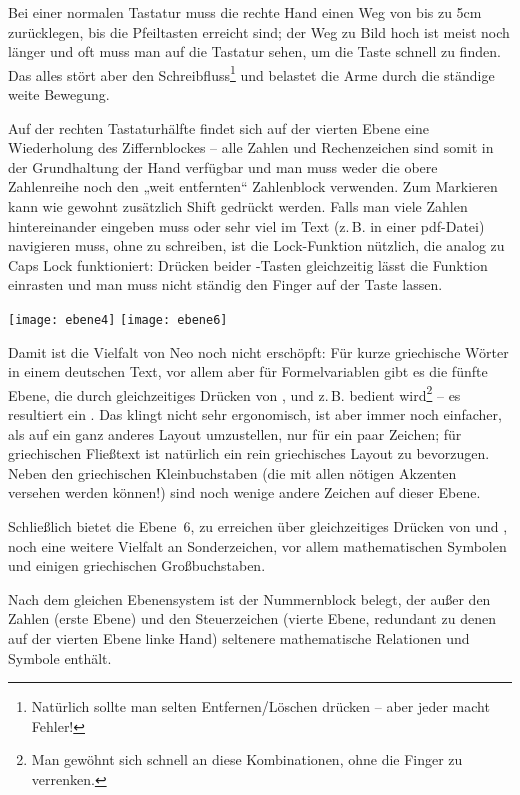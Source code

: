 \documentclass[ngerman]{dtk}
\newcommand{\taste}[1]{\makebox{\textsf{#1}}}
\newcommand{\fixme}[1]{\marginpar{\vspace*{-.5\baselineskip}\footnotesize\color{red}#1}}
\begin{document}
{Bei einer normalen Tastatur muss die rechte Hand einen Weg von bis zu 5cm zurücklegen, bis die Pfeiltasten erreicht sind; der Weg zu Bild hoch ist meist noch länger und oft muss man auf die Tastatur sehen, um die Taste schnell zu finden. Das alles stört aber den Schreibfluss\footnote{Natürlich sollte man selten Entfernen/Löschen drücken – aber jeder macht Fehler!} und belastet die Arme durch die ständige weite Bewegung.

Auf der rechten Tastaturhälfte findet sich auf der vierten Ebene eine Wiederholung des Ziffernblockes – alle Zahlen und Rechenzeichen sind somit in der Grundhaltung der Hand verfügbar und man muss weder die obere Zahlenreihe noch den „weit entfernten“ Zahlenblock verwenden. Zum Markieren kann wie gewohnt zusätzlich Shift gedrückt werden. Falls man viele Zahlen hintereinander eingeben muss oder sehr viel im Text (z.\,B. in einer pdf-Datei) navigieren muss, ohne zu schreiben, ist die Lock-Funktion nützlich, die analog zu Caps Lock funktioniert: Drücken beider \taste{Mod 4}-Tasten gleichzeitig lässt die Funktion einrasten und man muss nicht ständig den Finger auf der Taste lassen.

\begin{center}
\texttt{[image: ebene4]}%
\texttt{[image: ebene6]}
\end{center}

Damit ist die Vielfalt von Neo noch nicht erschöpft: Für kurze griechische Wörter in einem deutschen Text, vor allem aber für Formelvariablen gibt es die fünfte Ebene, die durch gleichzeitiges Drücken von \taste{Shift}, \taste{Mod 3} und z.\,B. \taste{a} bedient wird\footnote{Man gewöhnt sich schnell an diese Kombinationen, ohne die Finger zu verrenken.} – es resultiert ein \taste{$\alpha$}. Das klingt nicht sehr ergonomisch, ist aber immer noch einfacher, als auf ein ganz anderes Layout umzustellen, nur für ein paar Zeichen; für griechischen Fließtext ist natürlich ein rein griechisches Layout zu bevorzugen. Neben den griechischen Kleinbuchstaben (die mit allen nötigen Akzenten versehen werden können!) sind noch wenige andere Zeichen auf dieser Ebene.

Schließlich bietet die Ebene~6, zu erreichen über gleichzeitiges Drücken von \taste{Mod 3} und \taste{Mod 4}, noch eine weitere Vielfalt an Sonderzeichen, vor allem mathematischen Symbolen und einigen griechischen Großbuchstaben.

\fixme{\texttt{[image: nummernblock]}?}
Nach dem gleichen Ebenensystem ist der Nummernblock belegt, der außer den Zahlen (erste Ebene) und den Steuerzeichen (vierte Ebene, redundant zu denen auf der vierten Ebene linke Hand) seltenere mathematische Relationen und Symbole enthält.

}
\end{document}
